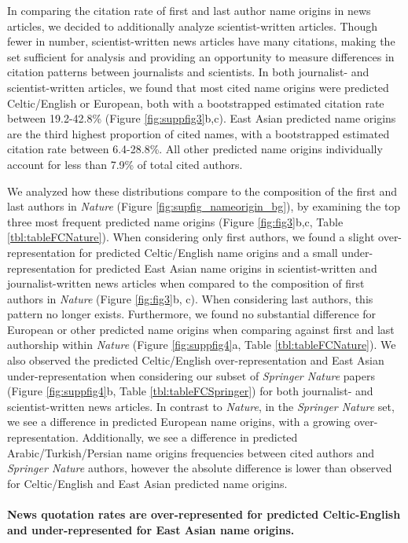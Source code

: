 In comparing the citation rate of first and last author name origins in news articles, we decided to additionally analyze scientist-written articles.
Though fewer in number, scientist-written news articles have many citations, making the set sufficient for analysis and providing an opportunity to measure differences in citation patterns between journalists and scientists.
In both journalist- and scientist-written articles, we found that most cited name origins were predicted Celtic/English or European, both with a bootstrapped estimated citation rate between 19.2-42.8\% (Figure \ref{fig:suppfig3}b,c).
East Asian predicted name origins are the third highest proportion of cited names, with a bootstrapped estimated citation rate between 6.4-28.8\%.
All other predicted name origins individually account for less than 7.9\% of total cited authors.

We analyzed how these distributions compare to the composition of the first and last authors in \emph{Nature} (Figure \ref{fig:supfig_nameorigin_bg}), by examining the top three most frequent predicted name origins (Figure \ref{fig:fig3}b,c, Table \ref{tbl:tableFCNature}).
When considering only first authors, we found a slight over-representation for predicted Celtic/English name origins and a small under-representation for predicted East Asian name origins in scientist-written and journalist-written news articles when compared to the composition of first authors in \emph{Nature} (Figure \ref{fig:fig3}b, c).
When considering last authors, this pattern no longer exists.
Furthermore, we found no substantial difference for European or other predicted name origins when comparing against first and last authorship within \emph{Nature} (Figure \ref{fig:suppfig4}a, Table \ref{tbl:tableFCNature}).
We also observed the predicted Celtic/English over-representation and East Asian under-representation when considering our subset of \emph{Springer Nature} papers (Figure \ref{fig:suppfig4}b, Table \ref{tbl:tableFCSpringer}) for both journalist- and scientist-written news articles.
In contrast to \emph{Nature}, in the \emph{Springer Nature} set, we see a difference in predicted European name origins, with a growing over-representation.
Additionally, we see a difference in predicted Arabic/Turkish/Persian name origins frequencies between cited authors and \emph{Springer Nature} authors, however the absolute difference is lower than observed for Celtic/English and East Asian predicted name origins.

\hypertarget{news-quotation-rates-are-over-represented-for-predicted-celtic-english-and-under-represented-for-east-asian-name-origins.}{%
\paragraph{News quotation rates are over-represented for predicted Celtic-English and under-represented for East Asian name origins.}\label{news-quotation-rates-are-over-represented-for-predicted-celtic-english-and-under-represented-for-east-asian-name-origins.}}

